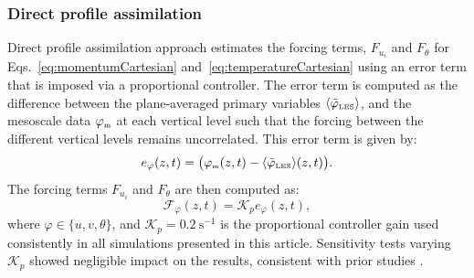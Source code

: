 \subsubsection{Direct profile assimilation}
\label{sec:DPA}
Direct profile assimilation approach estimates the forcing terms, $F_{u_i}$ and $F_{\theta}$ for Eqs.~\ref{eq:momentumCartesian} and~\ref{eq:temperatureCartesian} using an error term that is imposed via a proportional controller. The error term is computed as the difference between the plane-averaged primary variables $\langle \bar\varphi_{\hbox{\tiny LES}}\rangle$, and the mesoscale data $\varphi_{\hbox{\tiny m}}$ at each vertical level such that the forcing between the different vertical levels remains uncorrelated. This error term is given by:
\begin{equation}
e_{\varphi}(z, t) = \bigl(\varphi_{\hbox{\tiny m}}(z,t) - \langle\bar\varphi_{\hbox{\tiny LES}}\rangle(z,t)\bigr).
\label{eq:errorterm}
\end{equation}
The forcing terms $F_{u_i}$ and $F_{\theta}$ are then computed as:
\begin{equation}
\mathcal{F}_{\varphi}(z,t) = \mathcal{K}_p e_{\varphi}(z,t),
\label{dpaForcing}
\end{equation}
where $\varphi \in \{u, v, \theta \}$, and $\mathcal{K}_p = 0.2~\mathrm{s^{-1}}$ is the proportional controller gain used consistently in all simulations presented in this article. Sensitivity tests varying $\mathcal{K}_p$ showed negligible impact on the results, consistent with prior studies \citep{allaerts2020development}.

